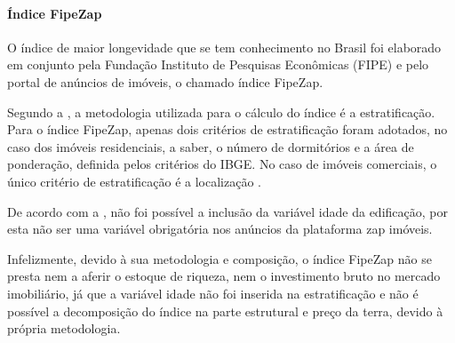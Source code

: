 \documentclass[
	12pt,				%
	oneside,			%
	a4paper,			%
	chapter=TITLE,		%
	section=TITLE,		%
	english,			%
	brazil				%
	]{abntex2}
\begin{document}
\hypertarget{uxedndice-fipezap}{%
\paragraph{Índice FipeZap}\label{uxedndice-fipezap}}

O índice de maior longevidade que se tem conhecimento no Brasil foi elaborado em
conjunto pela Fundação Instituto de Pesquisas Econômicas (FIPE) e pelo portal de
anúncios de imóveis, o chamado índice FipeZap.

Segundo a \textcite{fipezap}, a metodologia utilizada para o cálculo do índice é a
estratificação. Para o índice FipeZap, apenas dois critérios de estratificação
foram adotados, no caso dos imóveis residenciais, a saber, o número de
dormitórios e a área de ponderação, definida pelos critérios do IBGE. No caso de
imóveis comerciais, o único critério de estratificação é a localização
\autocite[7]{fipezap}.

De acordo com a \textcite{fipezap}, não foi possível a inclusão da variável idade da
edificação, por esta não ser uma variável obrigatória nos anúncios da plataforma
zap imóveis.

Infelizmente, devido à sua metodologia e composição, o índice FipeZap não se
presta nem a aferir o estoque de riqueza, nem o investimento bruto no mercado
imobiliário, já que a variável idade não foi inserida na estratificação e não é
possível a decomposição do índice na parte estrutural e preço da terra, devido à
própria metodologia.
\end{document}
